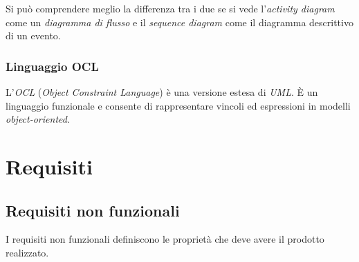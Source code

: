 \documentclass[12pt, a4paper]{report}
\theoremstyle{def}
\theoremstyle{definition}
\begin{document}
Si può comprendere meglio la differenza tra i due se si vede l'\emph{activity
diagram} come un \emph{diagramma di flusso} e il \emph{sequence diagram} come
il diagramma descrittivo di un evento.

\subsection{Linguaggio OCL}
L'\emph{OCL} (\emph{Object Constraint Language}) è una versione estesa di
\emph{UML}. È un linguaggio funzionale e consente di rappresentare vincoli ed
espressioni in modelli \emph{object-oriented}.

\chapter{Requisiti}
\section{Requisiti non funzionali}
I requisiti non funzionali definiscono le proprietà che deve avere il prodotto
realizzato.
\end{document}
